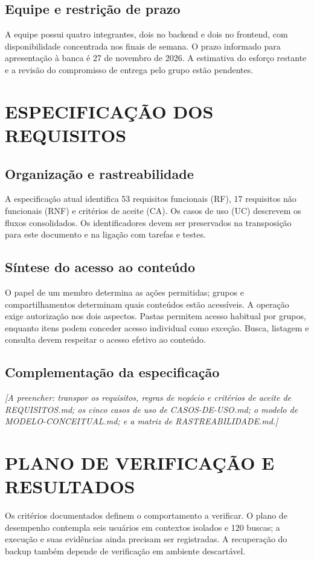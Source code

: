 \documentclass[12pt,oneside,openany,a4paper,english,brazil]{abntex2}
\newcommand{\pendente}[1]{\textit{[A preencher: #1.]}}
\begin{document}
\section{Equipe e restrição de prazo}
A equipe possui quatro integrantes, dois no backend e dois no frontend,
com disponibilidade concentrada nos finais de semana. O prazo informado
para apresentação à banca é 27 de novembro de 2026. A estimativa do esforço
restante e a revisão do compromisso de entrega pelo grupo estão pendentes.

\chapter{ESPECIFICAÇÃO DOS REQUISITOS}
\section{Organização e rastreabilidade}
A especificação atual identifica 53 requisitos funcionais (RF), 17 requisitos
não funcionais (RNF) e critérios de aceite (CA). Os casos de uso (UC)
descrevem os fluxos consolidados. Os identificadores devem ser preservados
na transposição para este documento e na ligação com tarefas e testes.

\section{Síntese do acesso ao conteúdo}
O papel de um membro determina as ações permitidas; grupos e
compartilhamentos determinam quais conteúdos estão acessíveis. A operação
exige autorização nos dois aspectos. Pastas permitem acesso habitual por
grupos, enquanto itens podem conceder acesso individual como exceção.
Busca, listagem e consulta devem respeitar o acesso efetivo ao conteúdo.

\section{Complementação da especificação}
\pendente{transpor os requisitos, regras de negócio e critérios de aceite
de REQUISITOS.md; os cinco casos de uso de CASOS-DE-USO.md;
o modelo de MODELO-CONCEITUAL.md; e a matriz de RASTREABILIDADE.md}

\chapter{PLANO DE VERIFICAÇÃO E RESULTADOS}
Os critérios documentados definem o comportamento a verificar. O plano
de desempenho contempla seis usuários em contextos isolados e 120 buscas;
a execução e suas evidências ainda precisam ser registradas. A recuperação
do backup também depende de verificação em ambiente descartável.
\end{document}
